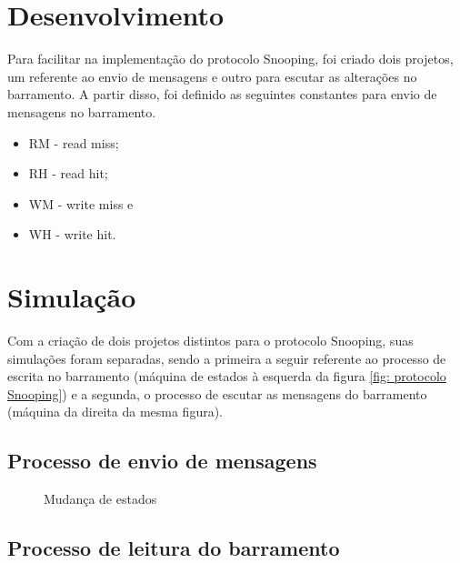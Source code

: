 \documentclass[12pt, a4paper]{article}
\begin{document}
    \section{Desenvolvimento}
    
	\par Para facilitar na implementação do protocolo Snooping, foi criado dois projetos, um referente ao envio de mensagens e outro para escutar as alterações no barramento. A partir disso, foi definido as seguintes constantes para envio de mensagens no barramento.
	
	\begin{itemize}
		\item RM - read miss;
		\item RH - read hit;
		\item WM - write miss e
		\item WH - write hit.
	\end{itemize}

	\section{Simulação}
	
	\par Com a criação de dois projetos distintos para o protocolo Snooping, suas simulações foram separadas, sendo a primeira a seguir referente ao processo de escrita no barramento (máquina de estados à esquerda da figura \ref{fig: protocolo Snooping}) e a segunda, o processo de escutar as mensagens do barramento (máquina da direita da mesma figura).
	
	\subsection{Processo de envio de mensagens}
	
	\begin{figure}[H]
		\centering
		\caption{Mudança de estados}
		\label{writing}
	\end{figure}
	
	
	\subsection{Processo de leitura do barramento}
	
\end{document}
